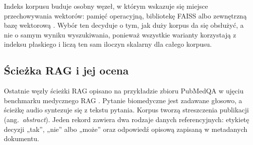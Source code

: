 %
%
%
%

Indeks korpusu buduje osobny węzeł, w którym wskazuje się miejsce przechowywania wektorów: pamięć
operacyjną, bibliotekę FAISS \cite{johnson2019billion} albo zewnętrzną bazę wektorową
\cite{wang2021milvus}. Wybór ten decyduje o tym, jak duży korpus da się obsłużyć, a nie o samym
wyniku wyszukiwania, ponieważ wszystkie warianty korzystają z indeksu płaskiego i liczą ten sam
iloczyn skalarny dla całego korpusu.

\subsection{Ścieżka RAG i jej ocena}
\label{sec:rag}
Ostatnie węzły ścieżki RAG opisano na przykładzie zbioru PubMedQA \cite{jin2019pubmedqa}
w ujęciu benchmarku medycznego RAG \cite{pubmed}. Pytanie biomedyczne jest zadawane głosowo, a ścieżkę
audio syntezuje się z tekstu pytania. Korpus tworzą streszczenia publikacji (ang.\
\textit{abstract}). Jeden rekord zawiera dwa rodzaje danych referencyjnych: etykietę decyzji
„tak'', „nie'' albo „może'' oraz odpowiedź opisową zapisaną w metadanych dokumentu.

